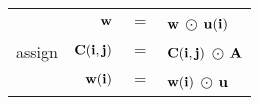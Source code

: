 \begin{table}[h]
\begin{center}
\begin{tabular}{l|rcl}
                   & ${\bf w}$   & $=$ & ${\bf w}$   $\odot$ ${\bf u}({\bf i})$ \\
{\sf assign}       & ${\bf C}({\bf i},{\bf j})$ & $=$ & ${\bf C}({\bf i},{\bf j})$ $\odot$ ${\bf A}$ \\
                   & ${\bf w}({\bf i})$ & $=$ & ${\bf w}({\bf i})$ $\odot$ ${\bf u}$ \\
\end{tabular}


\end{center}
\end{table}
